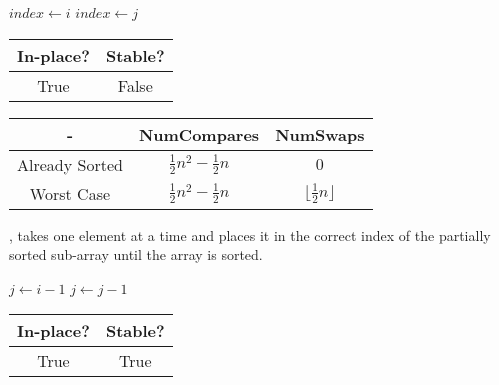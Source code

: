 \noindent \hrulefill
\begin{algorithmic}[1]
   
    \State $index \gets i$
          \State $index \gets j$
        \EndIf
      \EndFor
        \State {} 
      \EndIf
    \EndFor
    \State {}
  \EndFunction
\end{algorithmic}
\noindent \hrulefill

\begin{center}
  \begin{tabular}{ | c | c | }
    \hline
    In-place? & Stable? \\
    \hline
    True & False \\
    \hline
  \end{tabular}
\end{center}

\begin{center}
  \begin{tabular}{ | c | c | c | }
    \hline
    - & NumCompares & NumSwaps \\
    \hline
    Already Sorted & $\frac{1}{2} n^2 - \frac{1}{2} n$ & $0$ \\
    \hline
    Worst Case &  $\frac{1}{2} n^2 - \frac{1}{2} n$ & $\lfloor \frac{1}{2} n \rfloor$ \\
    \hline
  \end{tabular}
\end{center}

, takes one element at a time and places it in the correct index of the partially sorted sub-array until the array is sorted.

\noindent \hrulefill
\begin{algorithmic}[1]
   
      \State $j \gets i - 1$
      \State {} 
        \State $j \gets j - 1$
      \EndWhile
    \EndFor
    \State {}
  \EndFunction
\end{algorithmic}
\noindent \hrulefill

\begin{center}
  \begin{tabular}{ | c | c | }
    \hline
    In-place? & Stable? \\
    \hline
    True & True \\
    \hline
  \end{tabular}
\end{center}

